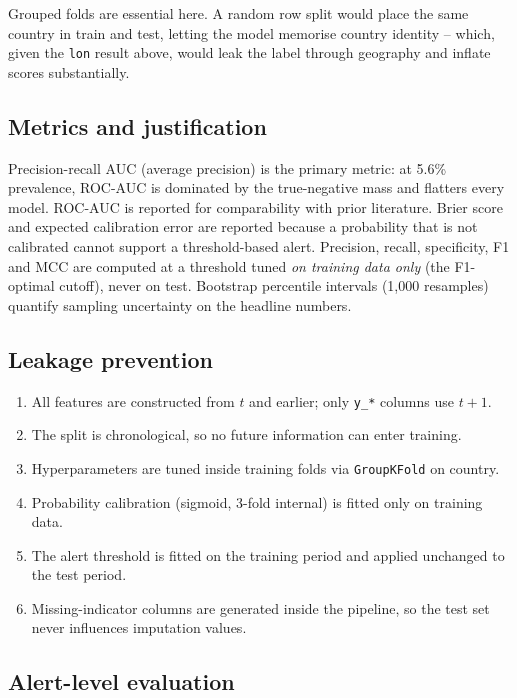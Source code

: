 \documentclass[11pt]{article}
\begin{document}
Grouped folds are essential here. A random row split would place the same country in train and
test, letting the model memorise country identity -- which, given the \texttt{lon} result above,
would leak the label through geography and inflate scores substantially.

\subsection{Metrics and justification}

Precision-recall AUC (average precision) is the primary metric: at 5.6\% prevalence, ROC-AUC
is dominated by the true-negative mass and flatters every model. ROC-AUC is reported for
comparability with prior literature. Brier score and expected calibration error are reported because
a probability that is not calibrated cannot support a threshold-based alert. Precision, recall,
specificity, F1 and MCC are computed at a threshold tuned \emph{on training data only} (the
F1-optimal cutoff), never on test. Bootstrap percentile intervals (1{,}000 resamples) quantify
sampling uncertainty on the headline numbers.

\subsection{Leakage prevention}

\begin{enumerate}
  \item All features are constructed from $t$ and earlier; only \texttt{y\_*} columns use $t+1$.
  \item The split is chronological, so no future information can enter training.
  \item Hyperparameters are tuned inside training folds via \texttt{GroupKFold} on country.
  \item Probability calibration (sigmoid, 3-fold internal) is fitted only on training data.
  \item The alert threshold is fitted on the training period and applied unchanged to the test period.
  \item Missing-indicator columns are generated inside the pipeline, so the test set never
        influences imputation values.
\end{enumerate}

\subsection{Alert-level evaluation}
\end{document}
